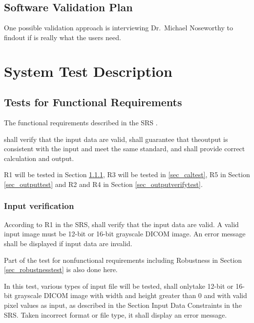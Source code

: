 \documentclass[12pt, titlepage]{article}
\begin{document}
\subsection{Software Validation Plan}

One possible validation approach is interviewing Dr.\ Michael Noseworthy to
findout if \progname{} is really what the users need.

\section{System Test Description} \label{sec_systestdescri}

\subsection{Tests for Functional Requirements} \label{sec_funcreqtest}

The functional requirements described in the SRS \cite{Dong2019SRS}. 

\progname{} shall verify that the input data are valid, shall guarantee that
theoutput is consistent with the input and meet the same standard, and shall
provide correct calculation and output.

R1 will be tested in Section \ref{sec_inputtest}, R3 will be tested in
\ref{sec_caltest}, R5 in Section \ref{sec_outputtest} and R2 and R4 in Section
\ref{sec_outputverifytest}.

\subsubsection{Input verification}
\label{sec_inputtest}

According to R1 in the SRS, \progname{} shall verify that the input data are
valid. A valid input image must be 12-bit or 16-bit grayscale DICOM image. An
error message shall be displayed if input data are invalid.

Part of the test for nonfunctional requirements including Robustness in Section
\ref{sec_robustnesstest} is also done here.

In this test, various types of input file will be tested, \progname{} shall
onlytake 12-bit or 16-bit grayscale DICOM image with width and height greater
than 0
and with valid pixel values as input, as described in the Section Input Data
Constraints in the SRS. Taken incorrect format or
file type, it shall display an error message.
		
\end{document}
